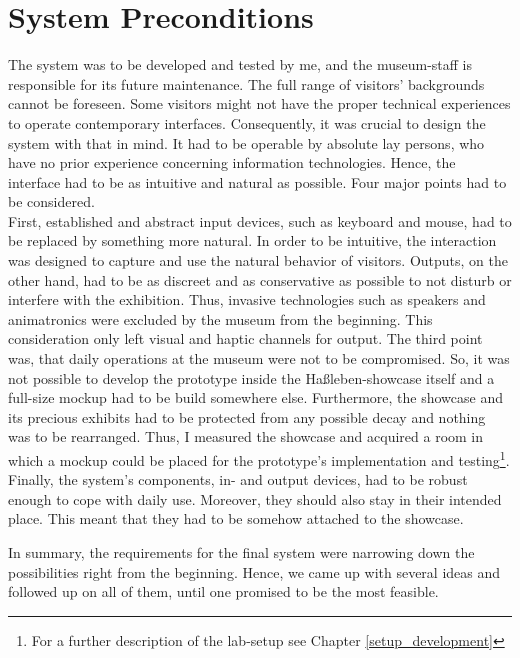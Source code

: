 
\section{System Preconditions}
\label{conception_system}

The system was to be developed and tested by me, and the museum-staff is responsible for its future maintenance. The full range of visitors' backgrounds cannot be foreseen. Some visitors might not have the proper technical experiences to operate contemporary interfaces. Consequently, it was crucial to design the system with that in mind. It had to be operable by absolute lay persons, who have no prior experience concerning information technologies. Hence, the interface had to be as intuitive and natural as possible. Four major points had to be considered.
\\
First, established and abstract input devices, such as keyboard and mouse, had to be replaced by something more natural. In order to be intuitive, the interaction was designed to capture and use the natural behavior of visitors. Outputs, on the other hand, had to be as discreet and as conservative as possible to not disturb or interfere with the exhibition. Thus, invasive technologies such as speakers and animatronics were excluded by the museum from the beginning. This consideration only left visual and haptic channels for output. The third point was, that daily operations at the museum were not to be compromised. So, it was not possible to develop the prototype inside the Haßleben-showcase itself and a full-size mockup had to be build somewhere else. Furthermore, the showcase and its precious exhibits had to be protected from any possible decay and nothing was to be rearranged. Thus, I measured the showcase and acquired a room in which a mockup could be placed for the prototype's implementation and testing\footnote{For a further description of the lab-setup see Chapter \ref{setup_development}}. Finally, the system's components, in- and output devices, had to be robust enough to cope with daily use. Moreover, they should also stay in their intended place. This meant that they had to be somehow attached to the showcase.

In summary, the requirements for the final system were narrowing down the possibilities right from the beginning. Hence, we came up with several ideas and followed up on all of them, until one promised to be the most feasible.

